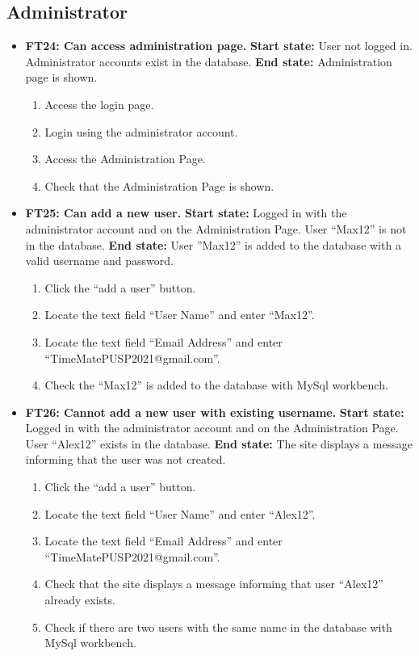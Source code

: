 \documentclass{article}
\begin{document}
\subsection{Administrator}
\begin{itemize}
		\item \textbf{FT24: Can access administration page.} \newline
		\textbf{Start state:} User not logged in. Administrator accounts exist in the database.
 \newline
		\textbf{End state:} Administration page is shown.
		\begin{enumerate}
			\item Access the login page.
			\item Login using the administrator account.
			\item Access the Administration Page.
			\item Check that the Administration Page is shown.
		\end{enumerate}
		
		\item \textbf{FT25: Can add a new user.} \newline
		\textbf{Start state:} Logged in with the administrator account and on the Administration Page. User “Max12” is not in the database. \newline
		\textbf{End state:} User ”Max12” is added to the database with a valid username and password.
		\begin{enumerate}
			\item Click the “add a user” button.
			\item Locate the text field “User Name” and enter “Max12”.
			\item Locate the text field “Email Address” and enter “TimeMatePUSP2021@gmail.com”.
			\item Check the “Max12” is added to the database with MySql workbench.
		\end{enumerate}
		
		
		\item \textbf{FT26: Cannot add a new user with existing username.} \newline
		\textbf{Start state:}  Logged in with the administrator account and on the Administration Page. User “Alex12” exists in the database.\newline
		\textbf{End state:} The site displays a message informing that the user was not created.
		\begin{enumerate}
			\item Click the “add a user” button.
			\item Locate the text field “User Name” and enter “Alex12”.
			\item Locate the text field “Email Address” and enter “TimeMatePUSP2021@gmail.com”.
			\item Check that the site displays a message informing that user “Alex12” already exists.
			\item Check if there are two users with the same name in the database with MySql workbench.
		\end{enumerate}
		

\end{itemize}
\end{document}
